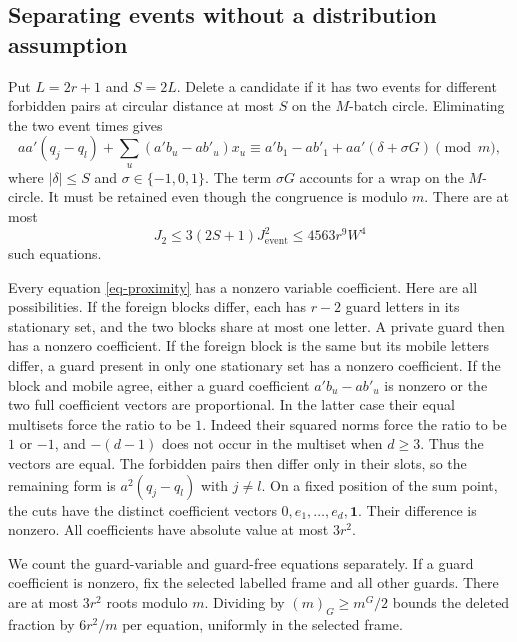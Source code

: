 \subsection{Separating events without a distribution assumption}

Put $L=2r+1$ and $S=2L$. Delete a candidate if it has two events for
different forbidden pairs at circular distance at most $S$ on the
$M$-batch circle. Eliminating the two event times gives
\begin{equation}\label{eq-proximity}
 aa'(q_j-q_l)+\sum_u(a'b_u-ab'_u)x_u
 \equiv a'b_1-ab'_1+aa'(\delta+\sigma G)\pmod m,
\end{equation}
where $|\delta|\le S$ and $\sigma\in\{-1,0,1\}$.
The term $\sigma G$ accounts for a wrap on the $M$-circle. It must be
retained even though the congruence is modulo $m$.
There are at most
\[
 J_2\le3(2S+1)J_{\mathrm{event}}^2\le4563r^9W^4
\]
such equations.

Every equation \eqref{eq-proximity} has a nonzero variable coefficient.
Here are all possibilities. If the foreign blocks differ, each has
$r-2$ guard letters in its stationary set, and the two blocks share at
most one letter. A private guard then has a nonzero coefficient. If the
foreign block is the same but its mobile letters differ, a guard present
in only one stationary set has a nonzero coefficient. If the block and
mobile agree, either a guard coefficient $a'b_u-ab'_u$ is nonzero or the
two full coefficient vectors are proportional. In the latter case their
equal multisets force the ratio to be $1$. Indeed their squared norms
force the ratio to be $1$ or $-1$, and $-(d-1)$ does not occur in the
multiset when $d\ge3$. Thus the vectors are equal. The forbidden pairs
then differ only in their slots, so the remaining form is
$a^2(q_j-q_l)$ with $j\ne l$. On a fixed position of the sum point,
the cuts have the distinct coefficient vectors
$0,e_1,\ldots,e_d,\boldsymbol{1}$. Their difference is nonzero.
All coefficients have absolute value at most $3r^2$.

We count the guard-variable and guard-free equations separately. If a
guard coefficient is nonzero, fix the selected labelled frame and all
other guards. There are at most $3r^2$ roots modulo $m$. Dividing by
$(m)_G\ge m^G/2$ bounds the deleted fraction by $6r^2/m$ per equation,
uniformly in the selected frame.

